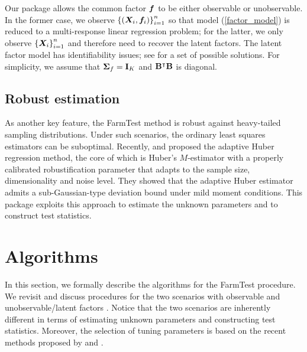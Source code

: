Our package allows the common factor $\bm f$ to be either observable or unobservable. In the former case, we observe  $\left\{ \left( \bm{X}_i, \bm f_i \right) \right\}_{i=1}^n$ so that model (\ref{factor_model}) is reduced to a multi-response linear regression problem; for the latter, we only observe $\left\{\bm{X}_i \right\}_{i=1}^n$ and therefore need to recover the latent factors. The latent factor model has identifiability issues; see \cite{BL2012} for a set of possible solutions. For simplicity, we assume that $\bm{\Sigma}_f = \mathbf{I}_K$ and $\mathbf{B}^\intercal \mathbf{B} \nonumber$ is diagonal.






\subsection{Robust estimation}



As another key feature, the FarmTest method is robust against heavy-tailed sampling distributions. Under such scenarios, the ordinary least squares estimators can be suboptimal.
Recently, \cite{FLW2017} and \cite{SZF2020} proposed the adaptive Huber regression method, the core of which is Huber's $M$-estimator \citep{huber1} with a properly calibrated robustification parameter that adapts to the sample size, dimensionality and noise level. They showed that the adaptive Huber estimator admits a sub-Gaussian-type deviation bound under mild moment conditions.
This package exploits this approach to estimate the unknown parameters and to construct test statistics.  

 




\section[Algorithms]{Algorithms}\label{sec:algorithm}
In this section, we formally describe the algorithms for the FarmTest procedure.
We revisit and discuss procedures for the two scenarios with observable and unobservable/latent factors \citep{ZBFL2017, FKSZ2017}. Notice that the two scenarios are inherently different in terms of estimating unknown parameters and constructing test statistics.
Moreover, the selection of tuning parameters is based on the recent methods proposed by \cite{KMRSZ2019} and \cite{WZZZ2020}.

